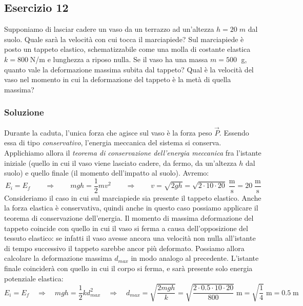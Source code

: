\documentclass[12pt,a4paper]{book}
\begin{document}
\subsection*{Esercizio 12}
Supponiamo di lasciar cadere un vaso da un terrazzo ad un'altezza $h=20\; m$ dal suolo. Quale sarà la velocità con cui tocca il marciapiede? Sul marciapiede è posto un tappeto elastico, schematizzabile come una molla di costante elastica $k=800 \;$N/m e lunghezza a riposo nulla. Se il vaso ha una massa $m=500 \;$ g, quanto vale la deformazione massima subita dal tappeto? Qual è la velocità del vaso nel momento in cui la deformazione del tappeto è la metà di quella massima?

\subsubsection*{Soluzione}
Durante la caduta, l'unica forza che agisce sul vaso è la forza peso $\vec{P}$. Essendo essa di tipo \textit{conservativo}, l'energia meccanica del sistema si conserva. Applichiamo allora il \textit{teorema di conservazione dell'energia meccanica} fra l'istante iniziale (quello in cui il vaso viene lasciato cadere, da fermo, da un'altezza $h$ dal suolo) e quello finale (il momento dell'impatto al suolo). Avremo:\\
\begin{equation*}
E_{i}=E_{f} \qquad  \Rightarrow \qquad  mgh= \frac{1}{2}m v^2  \qquad  \Rightarrow \qquad v= \sqrt{2gh} = \sqrt{2\cdot 10 \cdot 20} \; \frac{\text{m}}{\text{s}} = 20 \; \frac{\text{m}}{\text{s}}
\end{equation*}
Consideriamo il caso in cui sul marciapiede sia presente il tappeto elastico. Anche la forza elastica è conservativa, quindi anche in questo caso possiamo applicare il teorema di conservazione dell'energia. Il momento di massima deformazione del tappeto coincide con quello in cui il vaso si ferma a causa dell'opposizione del tessuto elastico:
se infatti il vaso avesse ancora una velocità non nulla all'istante di tempo successivo il tappeto sarebbe ancor più deformato. Possiamo allora calcolare la deformazione massima $d_{max}$ in modo analogo al precedente. L'istante finale coinciderà con quello in cui il corpo si ferma, e sarà presente solo energia potenziale elastica:\\
\begin{equation*}
E_{i}=E_{f} \quad  \Rightarrow \quad  mgh = \frac{1}{2}k d_{max}^2 \quad  \Rightarrow \quad d_{max}= \sqrt{\frac{2mgh}{k}} = \sqrt{\frac{2\cdot 0.5 \cdot 10 \cdot 20 }{800}} \; \text{m} = \sqrt{\frac{1}{4}}  \; \text{m} = 0.5 \; \text{m}
\end{equation*}
\end{document}
